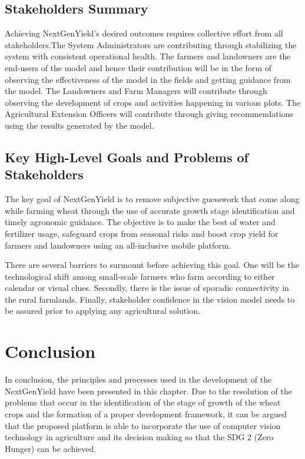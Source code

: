 \documentclass{FastFyp}
\begin{document}
\subsection{Stakeholders Summary}
Achieving NextGenYield's desired outcomes requires collective effort from all stakeholders.The System Administrators are contributing through stabilizing the system with consistent operational health. The farmers and landowners are the end-users of the model and hence their contribution will be in the form of observing the effectiveness of the model in the fields and getting guidance from the model. The Landowners and Farm Managers will contribute through observing the development of crops and activities happening in various plots. The Agricultural Extension Officers will contribute through giving recommendations using the results generated by the model.

 \subsection{Key High-Level Goals and Problems of Stakeholders}
The key goal of NextGenYield is to remove subjective guesswork that come along while farming wheat through the use of accurate growth stage identification and timely agronomic guidance. The objective is to make the best of water and fertilizer usage, safeguard crops from seasonal risks and boost crop yield for farmers and landowners using an all-inclusive mobile platform.

There are several barriers to surmount before achieving this goal. One will be the technological shift among small-scale farmers who farm according to either calendar or visual clues. Secondly, there is the issue of sporadic connectivity in the rural farmlands. Finally, stakeholder confidence in the vision model needs to be assured prior to applying any agricultural solution.

 
\section{Conclusion}

In conclusion, the principles and processes used in the development of the NextGenYield have been presented in this chapter. Due to the resolution of the problems that occur in the identification of the stage of growth of the wheat crops and the formation of a proper development framework, it can be argued that the proposed platform is able to incorporate the use of computer vision technology in agriculture and its decision making so that the SDG 2 (Zero Hunger) can be achieved.
\end{document}
